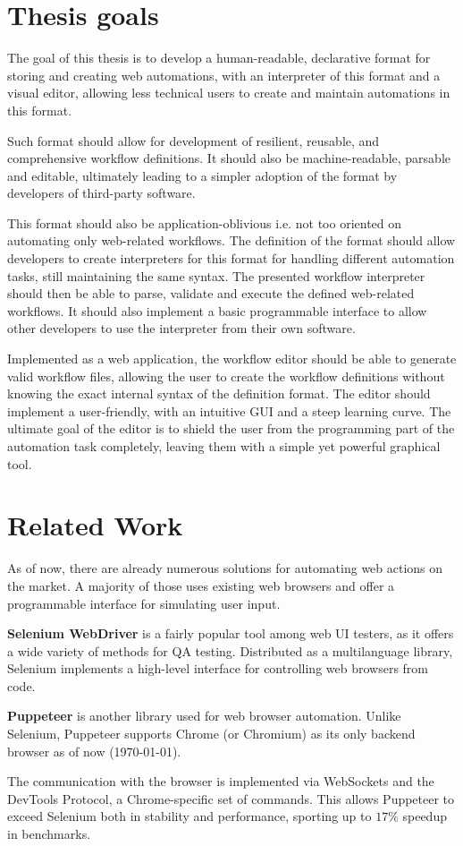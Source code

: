 \section*{Thesis goals}
The goal of this thesis is to develop a human-readable, declarative format for storing and creating web automations, with an interpreter of this format and a visual editor, allowing less technical users to create and maintain automations in this format.
\par
Such format should allow for development of resilient, reusable, and comprehensive workflow definitions. 
It should also be machine-readable, parsable and editable, ultimately leading to a simpler adoption of the format by developers of third-party software.
\par
This format should also be application-oblivious i.e. not too oriented on automating only web-related workflows.
The definition of the format should allow developers to create interpreters for this format for handling different automation tasks, still maintaining the same syntax.
The presented workflow interpreter should then be able to parse, validate and execute the defined web-related workflows. 
It should also implement a basic programmable interface to allow other developers to use the interpreter from their own software.
\par
Implemented as a web application, the workflow editor should be able to generate valid workflow files, allowing the user to create the workflow definitions without knowing the exact internal syntax of the definition format.
The editor should implement a user-friendly, with an intuitive \ac{GUI} and a steep learning curve.
The ultimate goal of the editor is to shield the user from the programming part of the automation task completely, leaving them with a simple yet powerful graphical tool.

\section*{Related Work}
As of now, there are already numerous solutions for automating web actions on the market. 
A majority of those uses existing web browsers and offer a programmable interface for simulating user input.

\textbf{Selenium WebDriver} is a fairly popular tool among web UI testers, as it offers a wide variety of methods for \ac{QA} testing.
Distributed as a multilanguage library, Selenium implements a high-level interface for controlling web browsers from code.

\textbf{Puppeteer} is another library used for web browser automation. 
Unlike Selenium, Puppeteer supports Chrome (or Chromium) as its only backend browser as of now (\today).

The communication with the browser is implemented via WebSockets and the DevTools Protocol, a Chrome-specific set of commands.
This allows Puppeteer to exceed Selenium both in stability and performance, sporting up to $17\%$ speedup in benchmarks. 